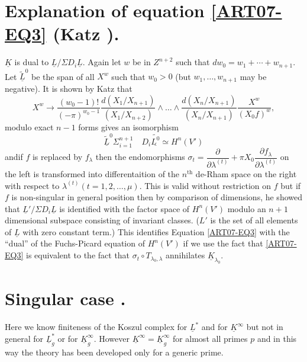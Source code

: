 \section{Explanation of equation \texorpdfstring{\eqref{ART07-EQ3}}{eq3} (Katz \texorpdfstring{\cite{ART07-KEY5}}{key5}).}\label{art07-sec3}

$\underline{K}$ is dual to $\underline{L}/\Sigma D_{i}\underline{L}$. Again let $w$ be in $Z^{n+2}$ such that $dw_{0}=w_{1}+\cdots+w_{n+1}$. Let $\widetilde{\underline{L}}^{0}$ be the span of all $X^{w}$ such that $w_{0}>0$ (but $w_{1},\ldots,w_{n+1}$ may be negative). It is shown by Katz that
$$
X^{w}\to \dfrac{(w_{0}-1)!}{(-\pi)^{w_{0}-1}}\dfrac{d(X_{1}/X_{n+1})}{(X_{1}/X_{n+2})}\wedge\ldots\wedge\dfrac{d(X_{n}/X_{n+1})}{(X_{n}/X_{n+1})}\dfrac{X^{w}}{(X_{0}f)^{w}},
$$
modulo exact $n-1$ forms gives an isomorphism
$$
\widetilde{\underline{L}}^{0}\Sigma^{n+1}_{i=1}\quad D_{i}\widetilde{\underline{L^{0}}}\simeq H^{n}(V')
$$
and\pageoriginale if $f$ is replaced by $f_{\lambda}$ then the endomorphisms $\sigma_{t}=\dfrac{\partial}{\partial \lambda^{(t)}}+\pi X_{0}\dfrac{\partial f_{\lambda}}{\partial \lambda^{(t)}}$ on the left is transformed into differentaition of the $n^{\text{th}}$ de-Rham space on the right with respect to $\lambda^{(t)}(t=1,2,\ldots,\mu)$. This is valid without restriction on $f$ but if $f$ is non-singular in general position then by comparison of dimensions, he showed that $\underline{L}'/\Sigma D_{i}\underline{L}$ is identified with the factor space of $H^{n}(V')$ modulo an $n+1$ dimensional subspace consisting of invariant classes. ($L'$ is the set of all elements of $\underline{L}$ with zero constant term.) This identifies Equation \eqref{ART07-EQ3} with the ``dual'' of the Fuchs-Picard equation of $H^{n}(V')$ if we use the fact that \eqref{ART07-EQ3} is equivalent to the fact that $\sigma_{t}\circ T_{\lambda_{0},\lambda}$ annihilates $\underline{K}_{\lambda_{0}}$.

\section{Singular case \texorpdfstring{\cite{ART07-KEY3}}{key3}.}\label{art07-sec4}

Here we know finiteness of the Koszul complex for $\underline{L}^{*}$ and for $\underline{K}^{\infty}$ but not in general for $\underline{L}^{*}_{g}$ or for $\underline{K}^{\infty}_{g}$. However $\underline{K}^{\infty}=\underline{K}^{\infty}_{g}$ for almost all primes $p$ and in this way the theory has been developed only for a generic prime.

